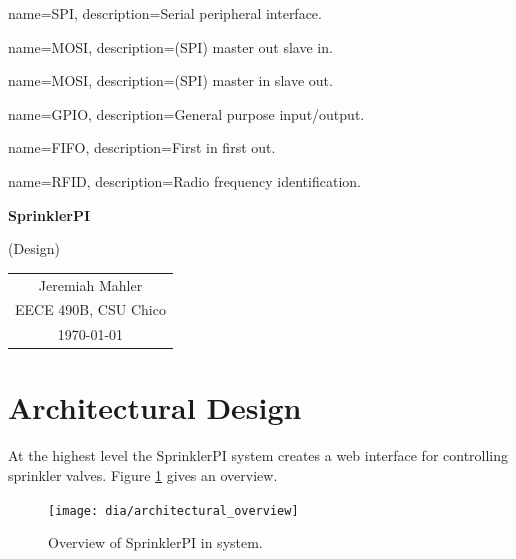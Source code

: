 \documentclass{article}
\begin{document}

{
	name={SPI},
	description={Serial peripheral interface}.
}

{
	name={MOSI},
	description={(SPI) master out slave in}.
}

{
	name={MOSI},
	description={(SPI) master in slave out}.
}

{
	name={GPIO},
	description={General purpose input/output}.
}

{
	name={FIFO},
	description={First in first out}.
}

{
	name={RFID},
	description={Radio frequency identification}.
}



\vspace*{1.0in}

\centerline{\Large \textbf{SprinklerPI}}
\centerline{(Design)}

\vspace{0.5in}

\begin{center}
\begin{tabular}{c}
Jeremiah Mahler \\
EECE 490B, CSU Chico \\
\today
\end{tabular}
\end{center}

\thispagestyle{empty}

\vfill

\pagebreak

\nocite{rasberrypi}
\thispagestyle{empty}
\tableofcontents

\clearpage
\section{Architectural Design}

At the highest level the SprinklerPI system creates a web interface
for controlling sprinkler valves.
Figure \ref{fig:archoview} gives an overview.

\begin{figure}[h!]
\begin{center}
\texttt{[image: dia/architectural\_overview]}
\end{center}
\caption{Overview of SprinklerPI in system.}
\label{fig:archoview}
\end{figure}
\end{document}
